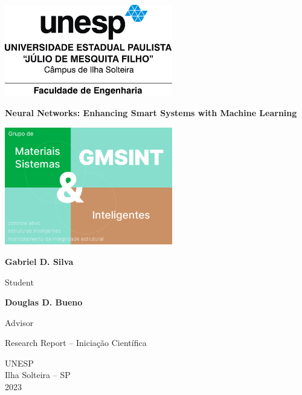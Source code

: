 \begin{titlepage}
    
\sffamily
\centering
\includegraphics[width=0.55\textwidth]{figures/logos/unesp-acessorio.pdf}



\vfill

{\LARGE\bfseries Neural Networks: Enhancing Smart Systems with Machine Learning}

\vfill

\includegraphics[width=0.55\textwidth]{figures/logos/gmsint_logo_new.pdf}

\vfill

\textbf{Gabriel D. Silva}

Student

\textbf{Douglas D. Bueno}

Advisor

\hspace{1cm}

Research Report -- Iniciação Científica 

\vfill

UNESP \\
Ilha Solteira -- SP \\
2023
\end{titlepage}


     
